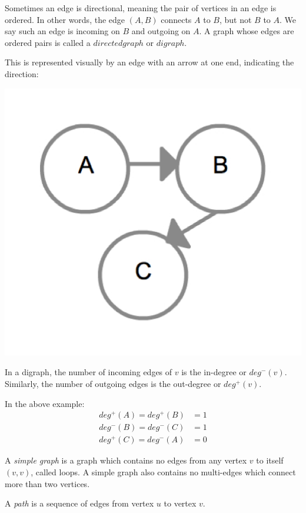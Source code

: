 Sometimes an edge is directional, meaning the pair of vertices in an
edge is ordered.  In other words, the edge $(A, B)$ connects $A$ to
$B$, but not $B$ to $A$.  We say such an edge is incoming on $B$ and
outgoing on $A$.  A graph whose edges are ordered pairs is called a
$directed graph$ or $digraph$.

This is represented visually by an edge with an arrow at one end,
indicating the direction:

{
  \includegraphics[scale=0.2]{DiGraph}
  \label{fig:DiGraph}
}

In a digraph, the number of incoming edges of $v$ is the in-degree or
$deg^-(v)$.  Similarly, the number of outgoing edges is the
out-degree or $deg^+(v)$.

In the above example:
%
\begin{align*}
deg^+(A) = deg^+(B) &= 1 \\
deg^-(B) = deg^-(C) &= 1 \\
deg^+(C) = deg^-(A) &= 0
\end{align*}

A \emph{simple graph} is a graph which contains no edges from any
vertex $v$ to itself $ (v,v) $, called loops.  A simple graph also
contains no multi-edges which connect more than two vertices.

A \emph{path} is a sequence of edges from vertex $u$ to vertex $v$.

